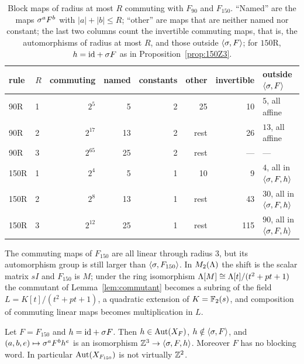 \begin{table}[t]
\caption{Block maps of radius at most $R$ commuting with $F_{90}$ and $F_{150}$. ``Named'' are the maps $\sigma^aF^b$ with $|a|+|b|\le R$; ``other'' are maps that are neither named nor constant; the last two columns count the invertible commuting maps, that is, the automorphisms of radius at most $R$, and those outside $\langle\sigma,F\rangle$; for $150$R, $h=\mathrm{id}+\sigma F$ as in Proposition~\ref{prop:150Z3}.}
\label{tab:census}
\centering
\begin{tabular}{llrrrrrl}
\toprule
rule & $R$ & commuting & named & constants & other & invertible & outside $\langle\sigma,F\rangle$\\
\midrule
90R & 1 & $2^{5}$ & 5 & 2 & 25 & 10 & $5$, all affine\\
90R & 2 & $2^{17}$ & 13 & 2 & rest & 26 & $13$, all affine\\
90R & 3 & $2^{65}$ & 25 & 2 & rest & --- & ---\\
150R & 1 & $2^{4}$ & 5 & 1 & 10 & 9 & $4$, all in $\langle\sigma,F,h\rangle$\\
150R & 2 & $2^{8}$ & 13 & 1 & rest & 43 & $30$, all in $\langle\sigma,F,h\rangle$\\
150R & 3 & $2^{12}$ & 25 & 1 & rest & 115 & $90$, all in $\langle\sigma,F,h\rangle$\\
\bottomrule
\end{tabular}
\end{table}

The commuting maps of $F_{150}$ are all linear through radius $3$, but its automorphism group is still larger than $\langle\sigma,F_{150}\rangle$. In $M_2(\Lambda)$ the shift is the scalar matrix $sI$ and $F_{150}$ is $M$; under the ring isomorphism $\Lambda[M]\cong\Lambda[t]/(t^2+pt+1)$ the commutant of Lemma~\ref{lem:commutant} becomes a subring of the field $L=K[t]/(t^2+pt+1)$, a quadratic extension of $K=\mathbb{F}_2(s)$, and composition of commuting linear maps becomes multiplication in $L$.

\begin{proposition}\label{prop:150Z3}
Let $F=F_{150}$ and $h=\mathrm{id}+\sigma F$. Then $h\in\operatorname{Aut}(X_F)$, $h\notin\langle\sigma,F\rangle$, and $(a,b,e)\mapsto\sigma^aF^bh^e$ is an isomorphism $\mathbb{Z}^3\to\langle\sigma,F,h\rangle$. Moreover $F$ has no blocking word. In particular $\operatorname{Aut}(X_{F_{150}})$ is not virtually $\mathbb{Z}^2$.
\end{proposition}

